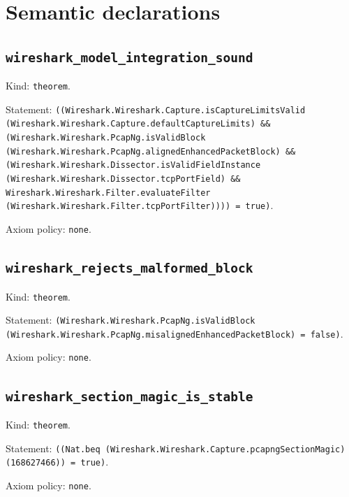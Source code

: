 \documentclass[11pt]{article}
\begin{document}
\section*{Semantic declarations}
\subsection*{\texttt{wireshark\_model\_integration\_sound}}
\noindent Kind: \texttt{theorem}.\par
\noindent Statement: \texttt{((Wireshark.Wireshark.Capture.isCaptureLimitsValid (Wireshark.Wireshark.Capture.defaultCaptureLimits) \&\& (Wireshark.Wireshark.PcapNg.isValidBlock (Wireshark.Wireshark.PcapNg.alignedEnhancedPacketBlock) \&\& (Wireshark.Wireshark.Dissector.isValidFieldInstance (Wireshark.Wireshark.Dissector.tcpPortField) \&\& Wireshark.Wireshark.Filter.evaluateFilter (Wireshark.Wireshark.Filter.tcpPortFilter)))) = true)}.\par
\noindent Axiom policy: \texttt{none}.\par
\subsection*{\texttt{wireshark\_rejects\_malformed\_block}}
\noindent Kind: \texttt{theorem}.\par
\noindent Statement: \texttt{(Wireshark.Wireshark.PcapNg.isValidBlock (Wireshark.Wireshark.PcapNg.misalignedEnhancedPacketBlock) = false)}.\par
\noindent Axiom policy: \texttt{none}.\par
\subsection*{\texttt{wireshark\_section\_magic\_is\_stable}}
\noindent Kind: \texttt{theorem}.\par
\noindent Statement: \texttt{((Nat.beq (Wireshark.Wireshark.Capture.pcapngSectionMagic) (168627466)) = true)}.\par
\noindent Axiom policy: \texttt{none}.\par
\end{document}
